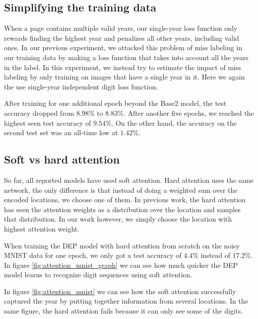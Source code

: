 \subsection{Simplifying the training data}

When a page contains multiple valid years, our single-year loss function only rewards finding the highest year and penalizes all other years, including valid ones.
In our previous experiment, we attacked this problem of miss labeling in our training data by making a loss function that takes into account all the years in the label. In this experiment, we instead try to estimate the impact of miss labeling by only training on images that have a single year in it. Here we again the use single-year independent digit loss function.

After training for one additional epoch beyond the  Base2 model, the test accuracy dropped from $8.98\%$ to $8.83\%$.
After another five epochs, we reached the highest seen test accuracy of $9.54\%$. On the other hand, the accuracy on the second test set was an all-time low at $1.42\%$.

\subsection{Soft vs hard attention} \label{sssec:result_attention}

So far, all reported models have used soft attention. Hard attention uses the same network, the only difference is that instead of doing a weighted sum over the encoded locations, we choose one of them. In previous work, the hard attention has seen the attention weights as a distribution over the location and samples that distribution. In our work however, we simply choose the location with highest attention weight.



When training the DEP model with hard attention from scratch on the noisy MNIST data for one epoch, we only got a test accuracy of $4.4\%$ instead of $17.2\%$.
In figure \ref{fig:attention_mnist_graph} we can see how much quicker the DEP model learns to recognize digit sequences using soft attention.



In figure \ref{fig:attention_mnist} we can see how the soft attention successfully captured the year by putting together information from several locations. In the same figure, the hard attention fails because it can only see some of the digits.

